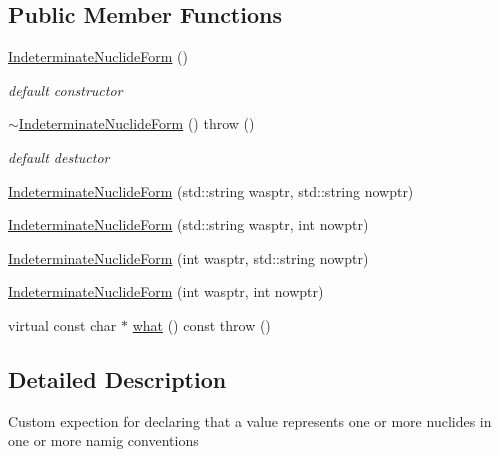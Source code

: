 \subsection*{Public Member Functions}
\begin{DoxyCompactItemize}
\item 
\mbox{\label{classpyne_1_1nucname_1_1_indeterminate_nuclide_form_aee3a250200624d6f4ab5935fd1e13d21}} 
\hyperlink{classpyne_1_1nucname_1_1_indeterminate_nuclide_form_aee3a250200624d6f4ab5935fd1e13d21}{Indeterminate\+Nuclide\+Form} ()
\begin{DoxyCompactList}\small\item\em default constructor \end{DoxyCompactList}\item 
\mbox{\label{classpyne_1_1nucname_1_1_indeterminate_nuclide_form_afc4bbaae82a451dcbf3a85b62ab8de0e}} 
\hyperlink{classpyne_1_1nucname_1_1_indeterminate_nuclide_form_afc4bbaae82a451dcbf3a85b62ab8de0e}{$\sim$\+Indeterminate\+Nuclide\+Form} ()  throw ()
\begin{DoxyCompactList}\small\item\em default destuctor \end{DoxyCompactList}\item 
\hyperlink{classpyne_1_1nucname_1_1_indeterminate_nuclide_form_a74d77801a214b679461eaf5dfbf7ab02}{Indeterminate\+Nuclide\+Form} (std\+::string wasptr, std\+::string nowptr)
\item 
\hyperlink{classpyne_1_1nucname_1_1_indeterminate_nuclide_form_a93724a9906be5a73b43b09ecdfed872d}{Indeterminate\+Nuclide\+Form} (std\+::string wasptr, int nowptr)
\item 
\hyperlink{classpyne_1_1nucname_1_1_indeterminate_nuclide_form_a3c9c6d0c859f3344fbb78b4259733678}{Indeterminate\+Nuclide\+Form} (int wasptr, std\+::string nowptr)
\item 
\hyperlink{classpyne_1_1nucname_1_1_indeterminate_nuclide_form_a565a1ca748bf437b18eee4834f65bf19}{Indeterminate\+Nuclide\+Form} (int wasptr, int nowptr)
\item 
virtual const char $\ast$ \hyperlink{classpyne_1_1nucname_1_1_indeterminate_nuclide_form_a28a16b4bf2b6ba6184758f8f469fb90b}{what} () const  throw ()
\end{DoxyCompactItemize}


\subsection{Detailed Description}
Custom expection for declaring that a value represents one or more nuclides in one or more namig conventions 

